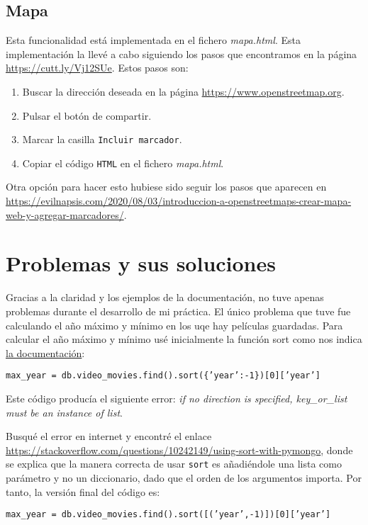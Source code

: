 \documentclass{article}
\begin{document}
\subsection{Mapa}

Esta funcionalidad está implementada en el fichero \textit{mapa.html}. Esta implementación la llevé a cabo siguiendo los pasos que encontramos en la página \href{https://cutt.ly/Vj12SUe}{https://cutt.ly/Vj12SUe}. Estos pasos son:

\begin{enumerate}
\item Buscar la dirección deseada en la página \href{https://www.openstreetmap.org}{https://www.openstreetmap.org}.
\item Pulsar el botón de compartir.
\item Marcar la casilla \texttt{Incluir marcador}.
\item Copiar el código \texttt{HTML} en el fichero \textit{mapa.html}.
\end{enumerate}

Otra opción para hacer esto hubiese sido seguir los pasos que aparecen en \href{https://evilnapsis.com/2020/08/03/introduccion-a-openstreetmaps-crear-mapa-web-y-agregar-marcadores/}{https://evilnapsis.com/2020/08/03/introduccion-a-openstreetmaps-crear-mapa-web-y-agregar-marcadores/}.

\section{Problemas y sus soluciones}

Gracias a la claridad y los ejemplos de la documentación, no tuve apenas problemas durante el desarrollo de mi práctica. El único problema que tuve fue calculando el año máximo y mínimo en los uqe hay películas guardadas.
Para calcular el año máximo y mínimo usé inicialmente la función sort como nos indica \href{https://docs.mongodb.com/manual/reference/method/cursor.sort/}{la documentación}:

\vspace{-1mm}
\begin{center}
  \texttt{max\_year = db.video\_movies.find().sort(\{'year':-1\})[0]['year']}
\end{center}

Este código producía el siguiente error: \textit{if no direction is specified, key\_or\_list must be an instance of list}.

Busqué el error en internet y encontré el enlace \href{https://stackoverflow.com/questions/10242149/using-sort-with-pymongo}{https://stackoverflow.com/questions/10242149/using-sort-with-pymongo}, donde se explica que la manera correcta de usar \texttt{sort} es añadiéndole una lista como parámetro y no un diccionario, dado que el orden de los argumentos importa. Por tanto, la versión final del código es:
\vspace{-1mm}
\begin{center}
  \texttt{max\_year = db.video\_movies.find().sort([('year',-1)])[0]['year']}
\end{center}
\end{document}
